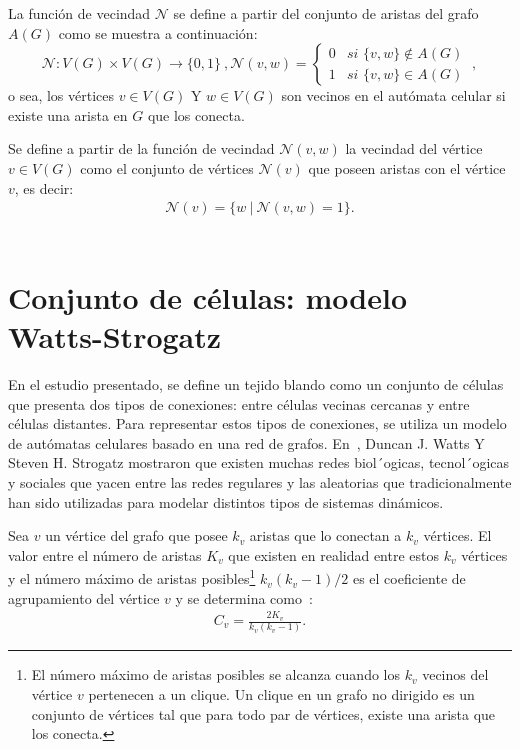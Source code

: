 La funci\'on de vecindad $\mathcal{N}$ se define a partir del conjunto de aristas del grafo $A(G)$ como se muestra a continuaci\'on:
\begin{subequations}
\begin{equation}
\boxed{\mathcal{N} : V(G) \times V(G) \rightarrow \lbrace 0,1 \rbrace}~, \label{eq-N}
\end{equation}
\begin{equation}
\boxed{\mathcal{N}(v,w) = \left\lbrace
	\begin{array}{lr}
		0& \textit{si } \lbrace v,w \rbrace \notin A(G)\\
		1& \textit{si } \lbrace v,w \rbrace \in A(G)
	\end{array}
\right.}~, \label{eq-N-2}
\end{equation}
\end{subequations}
o sea, los v\'ertices $v \in V(G)$ Y $w \in V(G)$  son vecinos en el aut\'omata celular si existe una arista en $G$ que los conecta.

Se define a partir de la funci\'on de vecindad $\mathcal{N}(v,w)$ la vecindad del v\'ertice $v \in V(G)$ como el conjunto de v\'ertices $\mathcal{N}(v)$ que poseen aristas con el v\'ertice $v$, es decir:
\begin{align} 
\mathcal{N}(v) = \lbrace w~|~\mathcal{N}(v,w)=1 \rbrace. \label{eq-neighbourhood}
\end{align}
\\
\section{Conjunto de c\'elulas: modelo Watts-Strogatz}

En el estudio presentado, se define un tejido blando como un conjunto de células que presenta dos tipos de conexiones: entre células vecinas cercanas y entre células distantes. Para representar estos tipos de conexiones, se utiliza un modelo de autómatas celulares basado en una red de grafos. En~\cite{9}, Duncan J. Watts Y Steven H. Strogatz mostraron que existen muchas redes biol´ogicas, tecnol´ogicas y sociales que yacen entre las redes regulares y las aleatorias que tradicionalmente han sido utilizadas para modelar distintos tipos de sistemas din\'amicos.

Sea $v$ un v\'ertice del grafo que posee $k_v$ aristas que lo conectan a $k_v$ v\'ertices. El valor entre el n\'umero de aristas $K_v$ que existen en realidad entre estos $k_v$ v\'ertices y el n\'umero m\'aximo de aristas posibles\footnote{El n\'umero m\'aximo de aristas posibles se alcanza cuando los $k_v$ vecinos del v\'ertice $v$ pertenecen a un clique. Un clique en un grafo no dirigido es un conjunto de v\'ertices tal que para todo par de v\'ertices, existe una arista que los conecta.} $k_v(k_v-1)/2$ es el coeficiente de agrupamiento del v\'ertice $v$ y se determina como~\cite{7}:
\begin{align}
C_v = \displaystyle\frac{2K_v}{k_v(k_v-1)}. \label{eq-clustering}
\end{align}

